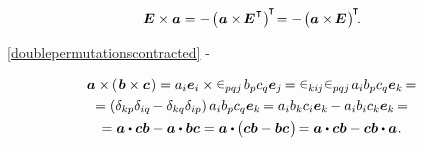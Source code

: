 \nopagebreak\vspace{-0.25em}
\begin{equation}\label{theparticularcasefortheunitdyadwithvector}
\UnitDyad \times \bm{a}
= - \hspace{.25ex} \bigl( \hspace{.1ex} \bm{a} \times \hspace{-0.25ex} \UnitDyad^{\hspace{.1ex}\T} \hspace{.1ex} \bigr)^{\hspace{-0.2ex}\T} \hspace{-0.4ex}
= - \hspace{.25ex} \bigl( \bm{a} \times \hspace{-0.25ex} \UnitDyad \hspace{.15ex} \bigr)^{\hspace{-0.2ex}\T} \hspace{-0.4ex}
.
\end{equation}


~\eqref{doublepermutationscontracted}
\crossproductinquotes\hbox{-}

\nopagebreak\vspace{-0.5em}
\begin{multline}
\bm{a} \times \hspace{-0.15ex} \left(\hspace{.2ex}{\bm{b} \times \bm{c}}\hspace{.15ex}\right)
= a_i \bm{e}_i \times \permutationsparitysymbols{pqj} \hspace{.2ex} b_p c_q \bm{e}_j \hspace{-0.2ex}
= \permutationsparitysymbols{ki\hspace{-0.1ex}j} \permutationsparitysymbols{pqj} \hspace{.2ex} a_i b_p c_q \bm{e}_k \hspace{-0.2ex} =
\\
= \left({\delta_{kp}\delta_{iq} \hspace{-0.2ex} - \delta_{kq}\delta_{ip}}\right) a_i b_p c_q \bm{e}_k \hspace{-0.2ex}
= a_i b_k c_i \bm{e}_k \hspace{-0.15ex} - a_i b_i c_k \bm{e}_k \hspace{-0.2ex} =
\\
= \bm{a} \dotp \bm{c} \bm{b} - \bm{a} \dotp \bm{b} \bm{c}
= \bm{a} \dotp \hspace{-0.1ex} \bigl( \bm{c} \bm{b} - \bm{b} \bm{c} \hspace{.15ex} \bigr) \hspace{-0.3ex}
= \bm{a} \dotp \bm{c} \bm{b} - \bm{c} \bm{b} \dotp \bm{a}
\hspace{.1ex} .
\end{multline}

